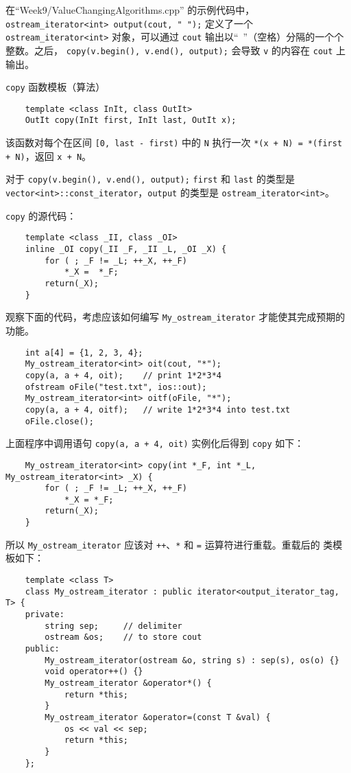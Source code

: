 \documentclass[UTF8]{ctexart}
\begin{document}
在``Week9/ValueChangingAlgorithms.cpp'' 的示例代码中，
\texttt{ostream_iterator<int> output(cout, " ");} 定义了一个 \texttt{ostream\_iterator<int>}
对象，可以通过 \texttt{cout} 输出以“~”（空格）分隔的一个个整数。之后，
\texttt{copy(v.begin(), v.end(), output);} 会导致 \texttt{v} 的内容在 \texttt{cout} 上输出。

\texttt{copy} 函数模板（算法）
\begin{verbatim}
    template <class InIt, class OutIt>
    OutIt copy(InIt first, InIt last, OutIt x);
\end{verbatim}
该函数对每个在区间 \texttt{[0, last - first)} 中的 \texttt{N} 执行一次
\texttt{*(x + N) = *(first + N)}，返回 \texttt{x + N}。

对于 \texttt{copy(v.begin(), v.end(), output);} \texttt{first} 和 \texttt{last} 的类型是
\texttt{vector<int>::const\_iterator}，\texttt{output} 的类型是 \texttt{ostream\_iterator<int>}。

\texttt{copy} 的源代码：
\begin{verbatim}
    template <class _II, class _OI>
    inline _OI copy(_II _F, _II _L, _OI _X) {
        for ( ; _F != _L; ++_X, ++_F)
            *_X =  *_F;
        return(_X);
    }
\end{verbatim}

观察下面的代码，考虑应该如何编写 \texttt{My\_ostream\_iterator} 才能使其完成预期的功能。
\begin{verbatim}
    int a[4] = {1, 2, 3, 4};
    My_ostream_iterator<int> oit(cout, "*");
    copy(a, a + 4, oit);    // print 1*2*3*4
    ofstream oFile("test.txt", ios::out);
    My_ostream_iterator<int> oitf(oFile, "*");
    copy(a, a + 4, oitf);   // write 1*2*3*4 into test.txt
    oFile.close();
\end{verbatim}

上面程序中调用语句 \texttt{copy(a, a + 4, oit)} 实例化后得到 \texttt{copy} 如下：
\begin{verbatim}
    My_ostream_iterator<int> copy(int *_F, int *_L, My_ostream_iterator<int> _X) {
        for ( ; _F != _L; ++_X, ++_F)
            *_X = *_F;
        return(_X);
    }
\end{verbatim}
所以 \texttt{My\_ostream\_iterator} 应该对 \texttt{++}、\texttt{*} 和 \texttt{=} 运算符进行重载。重载后的
类模板如下：
\begin{verbatim}
    template <class T>
    class My_ostream_iterator : public iterator<output_iterator_tag, T> {
    private:
        string sep;     // delimiter
        ostream &os;    // to store cout
    public:
        My_ostream_iterator(ostream &o, string s) : sep(s), os(o) {}
        void operator++() {}
        My_ostream_iterator &operator*() {
            return *this;
        }
        My_ostream_iterator &operator=(const T &val) {
            os << val << sep;
            return *this;
        }
    };
\end{verbatim}
\end{document}
